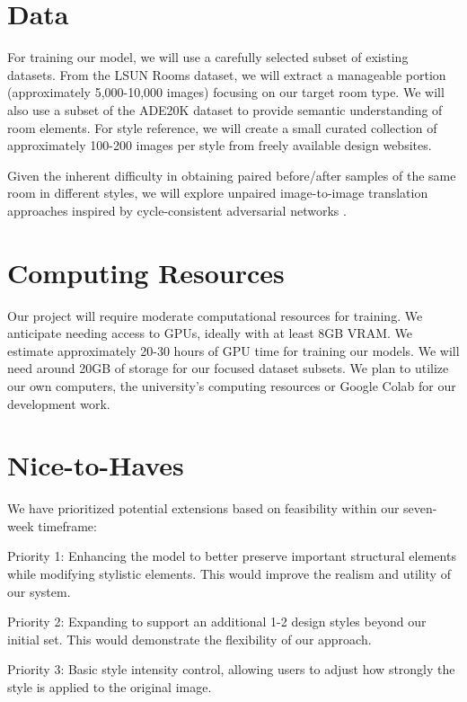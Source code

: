 \documentclass[twocolumn,superscriptaddress,aps]{revtex4-1}
\begin{document}
\section{Data}

For training our model, we will use a carefully selected subset of existing datasets. From the LSUN Rooms dataset, we will extract a manageable portion (approximately 5,000-10,000 images) focusing on our target room type. We will also use a subset of the ADE20K dataset to provide semantic understanding of room elements. For style reference, we will create a small curated collection of approximately 100-200 images per style from freely available design websites.

Given the inherent difficulty in obtaining paired before/after samples of the same room in different styles, we will explore unpaired image-to-image translation approaches inspired by cycle-consistent adversarial networks \cite{zhu_unpaired_2020}.

\section{Computing Resources}

Our project will require moderate computational resources for training. We anticipate needing access to GPUs, ideally with at least 8GB VRAM. We estimate approximately 20-30 hours of GPU time for training our models. We will need around 20GB of storage for our focused dataset subsets. We plan to utilize our own computers, the university's computing resources or Google Colab for our development work.

\section{Nice-to-Haves}

We have prioritized potential extensions based on feasibility within our seven-week timeframe:

Priority 1: Enhancing the model to better preserve important structural elements while modifying stylistic elements. This would improve the realism and utility of our system.

Priority 2: Expanding to support an additional 1-2 design styles beyond our initial set. This would demonstrate the flexibility of our approach.

Priority 3: Basic style intensity control, allowing users to adjust how strongly the style is applied to the original image.
\end{document}
